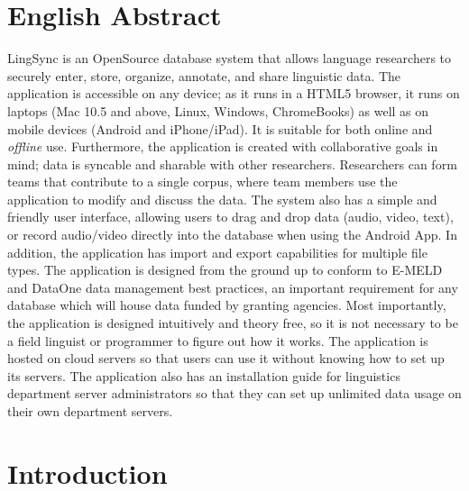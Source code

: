 \documentclass[letterpaper, 12pt, dvips]{mitwpl}
\begin{document}
\section*{English Abstract}


LingSync is an OpenSource database system that allows language researchers to securely enter, store, organize, annotate, and share linguistic data. The application is accessible on any device; as it runs in a HTML5 browser, it runs on laptops (Mac  10.5 and above, Linux, Windows, ChromeBooks) as well as on mobile devices (Android and iPhone/iPad).  It is suitable for both online and \emph{offline} use.%
Furthermore, the application is created with collaborative goals in mind;  data is syncable and sharable with other researchers.  Researchers can form teams that contribute to a single corpus, where team members use the application to modify and discuss the data. The system also has a simple and friendly user interface, allowing users to drag and drop data (audio, video, text), or record audio/video directly into the database when using the Android App. In addition, the application  has import and export capabilities for multiple file types. The application is designed from the ground up to conform to E-MELD and DataOne data management best practices, an important requirement for any database which will house data funded by granting agencies.  Most importantly, the application is designed intuitively and theory free, so it is not necessary to be a field linguist or programmer to figure out how it works. The application is hosted on cloud servers so that users can use it without knowing how to set up its servers. The application also has an installation guide for linguistics department server administrators so that they can set up unlimited data usage on their own department servers.



\section{Introduction}
\end{document}
